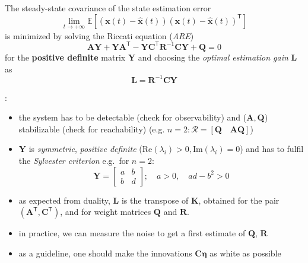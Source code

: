
The steady-state covariance of the state estimation error
\begin{equation*}
    \lim_{t\to+\infty}\mathbb{E}\left[(\mathbf{x}(t)-\hat{\mathbf{x}}(t)){(\mathbf{x}(t)-\hat{\mathbf{x}}(t))}^{\mathsf{T}}\right]
\end{equation*}
is minimized by solving the Riccati equation (\textit{ARE})
\begin{equation*}
    \mathbf{AY}+\mathbf{YA}^{\mathsf{T}}-\mathbf{YC}^{\mathsf{T}} \mathbf{R}^{-1}\mathbf{CY}+\mathbf{Q}=0
\end{equation*}
for the \textbf{positive definite} matrix $\mathbf{Y}$ and choosing the \textit{optimal estimation gain} $\mathbf{L}$ as
\begin{equation*}
    \mathbf{L}=\mathbf{R}^{-1}\mathbf{CY}
\end{equation*}

:

\begin{itemize}
    \item the system has to be detectable (check for observability) and ($\mathbf{A,Q}$) stabilizable (check for reachability)\newline
          (e.g. $n=2: \mathbf{\mathcal{R}}= \left[\mathbf{Q}\quad \mathbf{AQ}\right]$)
    \item $\mathbf{Y}$ is \textit{symmetric}, \textit{positive definite} ($\mathrm{Re}(\lambda_i) > 0, \mathrm{Im}(\lambda_i) = 0$) and has to fulfil the \textit{Sylvester criterion} e.g.\ for $n=2$:
          \noindent\begin{equation*}
              \mathbf{Y}=\begin{bmatrix}
                  a & b \\
                  b & d
              \end{bmatrix}; \quad a>0, \quad ad-b^2>0
          \end{equation*}
    \item as expected from duality, $\mathbf{L}$ is the transpose of $\mathbf{K}$, obtained for the pair $(\mathbf{A}^{\mathsf{T}}, \mathbf{C}^{\mathsf{T}})$, and for weight matrices $\mathbf{Q}$ and $\mathbf{R}$.
    \item in practice, we can measure the noise to get a first estimate of $\mathbf{Q}$, $\mathbf{R}$
    \item as a guideline, one should make the innovations $\mathbf{C}\boldsymbol{\eta}$ as white as possible
\end{itemize}

